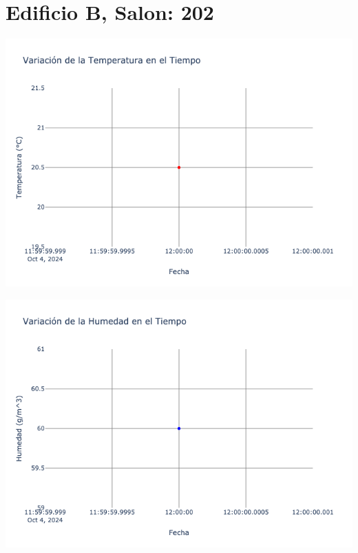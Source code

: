 \documentclass{article}
\begin{document}
    \section{Edificio B, Salon: 202}
    \noindent
    \begin{minipage}{0.48\textwidth}
        \centering
        \includegraphics[width=\textwidth]{../img/poli/TS202-90Dias-03-12-2024.png}
    \end{minipage}
    \hfill
    \begin{minipage}{0.48\textwidth}
        \centering
        \includegraphics[width=\textwidth]{../img/poli/HS202-90Dias-03-12-2024.png}
    \end{minipage}
\end{document}
